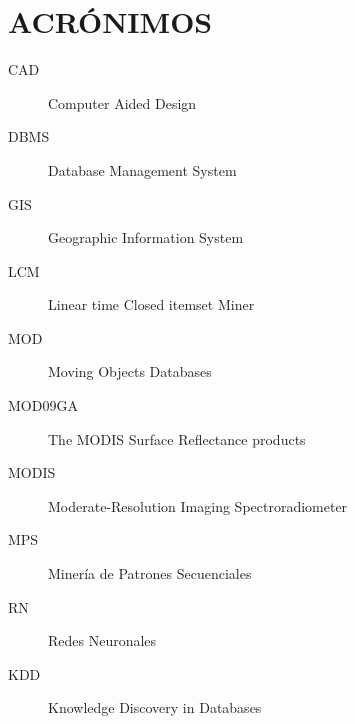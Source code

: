 \chapter*{ACRÓNIMOS}
 
\begin{description}
 \item [CAD] Computer Aided Design
 \item [DBMS] Database Management System
 \item [GIS] Geographic Information System
 \item [LCM] Linear time Closed itemset Miner
 \item [MOD] Moving Objects Databases
 \item [MOD09GA] The MODIS Surface Reflectance products
 \item [MODIS] Moderate-Resolution Imaging Spectroradiometer
 \item [MPS] Minería de Patrones Secuenciales
 \item [RN] Redes Neuronales
 \item [KDD] Knowledge Discovery in Databases
 
\end{description}
